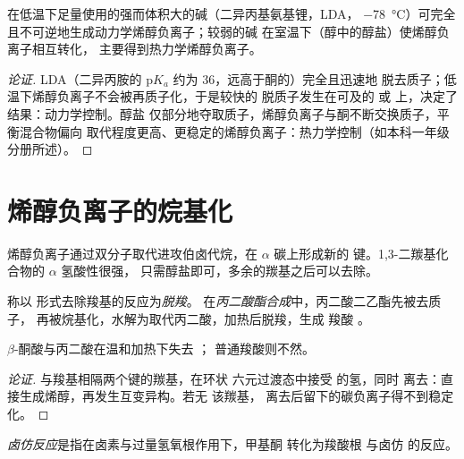 \begin{proposition}[烯醇负离子的选择]\label{prop:b2:enolates-aldol:enolate-control}
在低温下足量使用的强而体积大的碱（二异丙基氨基锂，LDA，
\qty{-78}{\degreeCelsius}）可完全且不可逆地生成动力学烯醇负离子；较弱的碱
在室温下（醇中的醇盐）使烯醇负离子相互转化，
主要得到热力学烯醇负离子。
\end{proposition}

\begin{proof}[论证]
LDA（二异丙胺的 $\mathrm pK_a$ 约为 36，远高于酮的）完全且迅速地
脱去质子；低温下烯醇负离子不会被再质子化，于是较快的
脱质子发生在可及的  或  上，决定了结果：动力学控制。醇盐
仅部分地夺取质子，烯醇负离子与酮不断交换质子，平衡混合物偏向
取代程度更高、更稳定的烯醇负离子：热力学控制（如本科一年级分册所述）。
\end{proof}

\section{烯醇负离子的烷基化}

烯醇负离子通过双分子取代进攻伯卤代烷，在
$\alpha$ 碳上形成新的  键。1,3-二羰基化合物的 $\alpha$ 氢酸性很强，
只需醇盐即可，多余的羰基之后可以去除。

\begin{definition}[脱羧]\label{def:b2:enolates-aldol:decarboxylation}
称以  形式去除羧基的反应为\emph{脱羧}。
在\emph{丙二酸酯合成}中，丙二酸二乙酯先被去质子，
再被烷基化，水解为取代丙二酸，加热后脱羧，生成
羧酸 。
\end{definition}

\begin{proposition}[易脱羧的情形]\label{prop:b2:enolates-aldol:decarboxylation}
$\beta$-酮酸与丙二酸在温和加热下失去 ；
普通羧酸则不然。
\end{proposition}

\begin{proof}[论证]
与羧基相隔两个键的羰基，在环状
六元过渡态中接受  的氢，同时  离去：直接生成烯醇，再发生互变异构。若无
该羰基， 离去后留下的碳负离子得不到稳定化。
\end{proof}

\begin{definition}[卤仿反应]\label{def:b2:enolates-aldol:haloform}
\emph{卤仿反应}是指在卤素与过量氢氧根作用下，甲基酮 
转化为羧酸根  与卤仿  的反应。
\end{definition}

